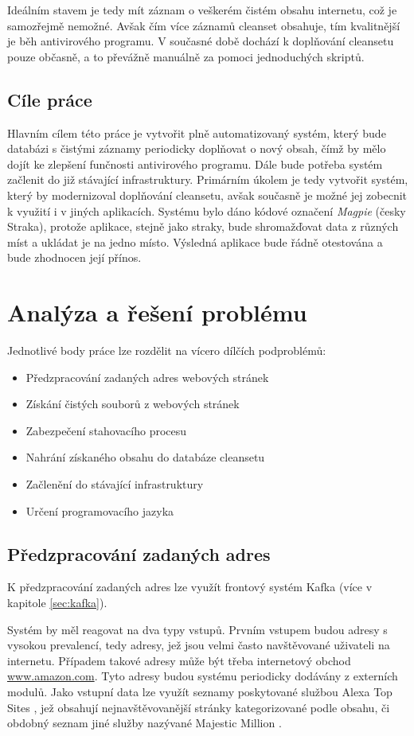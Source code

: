 \documentclass[thesis=M,czech,hidelinks]{FITthesis}[2013/05/06]
\begin{document}
Ideálním stavem je tedy mít záznam o veškerém čistém obsahu internetu, což je samozřejmě nemožné. Avšak čím více záznamů cleanset obsahuje, tím kvalitnější je běh antivirového programu. V současné době dochází k doplňování cleansetu pouze občasně, a to převážně manuálně za pomoci jednoduchých skriptů.

\section{Cíle práce} 
 Hlavním cílem této práce je vytvořit plně automatizovaný systém, který bude databázi s čistými záznamy periodicky doplňovat o nový obsah, čímž by mělo dojít ke zlepšení funčnosti antivirového programu. Dále bude potřeba systém začlenit do již stávající infrastruktury. Primárním úkolem je tedy vytvořit systém, který by modernizoval doplňování cleansetu, avšak současně je možné jej zobecnit k využití i v jiných aplikacích. Systému bylo dáno kódové označení \textit{Magpie} (česky Straka), protože aplikace, stejně jako straky, bude shromažďovat data z různých míst a ukládat je na jedno místo. Výsledná aplikace bude řádně otestována a bude zhodnocen její přínos.


\chapter{Analýza a řešení problému}
Jednotlivé body práce lze rozdělit na vícero dílčích podproblémů:

\begin{itemize}
	\item Předzpracování zadaných adres webových stránek
	\item Získání čistých souborů z webových stránek
	\item Zabezpečení stahovacího procesu
	\item Nahrání získaného obsahu do databáze cleansetu
	\item Začlenění do stávající infrastruktury
	\item Určení programovacího jazyka
\end{itemize}


\section{Předzpracování zadaných adres}
K předzpracování zadaných adres lze využít frontový systém Kafka (více v kapitole \ref{sec:kafka}).

Systém by měl reagovat na dva typy vstupů. Prvním vstupem budou adresy s vysokou prevalencí, tedy adresy, jež jsou velmi často navštěvované uživateli na internetu. Případem takové adresy může být třeba internetový obchod \url{www.amazon.com}. Tyto adresy budou systému periodicky dodávány z externích modulů. Jako vstupní data lze využít seznamy poskytované službou Alexa Top Sites \cite{alexa}, jež obsahují nejnavštěvovanější stránky kategorizované podle obsahu, či obdobný seznam jiné služby nazývané Majestic Million \cite{majestic}.
\end{document}
